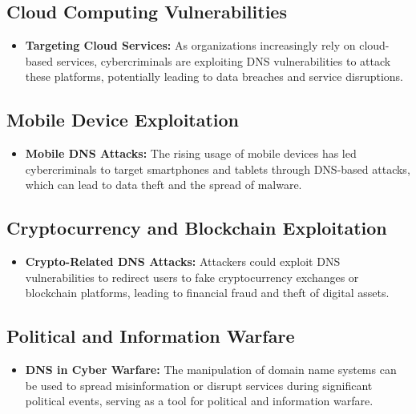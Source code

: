 \subsection{Cloud Computing Vulnerabilities}
\begin{itemize}
    \item \textbf{Targeting Cloud Services:} As organizations increasingly rely on cloud-based services, cybercriminals are exploiting DNS vulnerabilities to attack these platforms, potentially leading to data breaches and service disruptions.\cite{mather2009cloud}
\end{itemize}

\subsection{Mobile Device Exploitation}
\begin{itemize}
    \item \textbf{Mobile DNS Attacks:} The rising usage of mobile devices has led cybercriminals to target smartphones and tablets through DNS-based attacks, which can lead to data theft and the spread of malware.\cite{au2016mobile}
\end{itemize}

\subsection{Cryptocurrency and Blockchain Exploitation}
\begin{itemize}
    \item \textbf{Crypto-Related DNS Attacks:} Attackers could exploit DNS vulnerabilities to redirect users to fake cryptocurrency exchanges or blockchain platforms, leading to financial fraud and theft of digital assets.\cite{bashir2019advanced}
\end{itemize}

\subsection{Political and Information Warfare}
\begin{itemize}
    \item \textbf{DNS in Cyber Warfare:} The manipulation of domain name systems can be used to spread misinformation or disrupt services during significant political events, serving as a tool for political and information warfare.\cite{chapple2021cyberwarfare}
\end{itemize}

